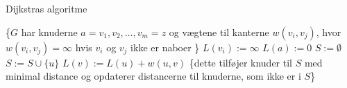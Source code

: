 \begin{algorithm}[H]
\caption{Dijkstras algoritme}
\begin{algorithmic}[1]

    \State \{$G$ {har knuderne $a = v_{1}, v_{2}, \dotsc, v_{m} = z$ og vægtene til kanterne $w(v_{i}, v_{j})$, hvor $w(v_{i}, v_{j}) = \infty$ hvis $v_{i}$ og $v_{j}$ ikke er naboer \}}
		\State $L(v_{i}) := \infty$
	\EndFor
	\State $L(a) := 0$	
	\State $S := \emptyset$
        \State $S := S \cup \{u\}$
        	 {$L(v) := L(u) + w(u,v)$}
        	\State \{dette tilføjer knuder til $S$ med minimal 			distance og opdaterer distancerne til
        	\State knuderne, som ikke er i $S$\}
        	\EndIf
    	\EndFor
    \EndWhile
\EndProcedure

\end{algorithmic}
\label{alg:dijkstra}
\end{algorithm}